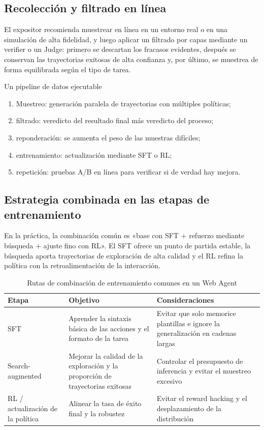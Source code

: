 \documentclass[a4paper]{article}
\begin{document}
\subsection{Recolección y filtrado en línea}
El expositor recomienda muestrear en línea en un entorno real o en una simulación de alta fidelidad, y luego aplicar un filtrado por capas mediante un verifier o un Judge: primero se descartan los fracasos evidentes, después se conservan las trayectorias exitosas de alta confianza y, por último, se muestrea de forma equilibrada según el tipo de tarea.

\begin{knowledgebox}{Un pipeline de datos ejecutable}
\begin{enumerate}
    \item Muestreo: generación paralela de trayectorias con múltiples políticas;
    \item filtrado: veredicto del resultado final más veredicto del proceso;
    \item reponderación: se aumenta el peso de las muestras difíciles;
    \item entrenamiento: actualización mediante SFT o RL;
    \item repetición: pruebas A/B en línea para verificar si de verdad hay mejora.
\end{enumerate}
\end{knowledgebox}

\subsection{Estrategia combinada en las etapas de entrenamiento}
En la práctica, la combinación común es «base con SFT + refuerzo mediante búsqueda + ajuste fino con RL». El SFT ofrece un punto de partida estable, la búsqueda aporta trayectorias de exploración de alta calidad y el RL refina la política con la retroalimentación de la interacción.

\begin{table}[H]
\centering
\small
\begin{tabular}{p{2.4cm}p{3.9cm}p{4.7cm}}
\toprule
\textbf{Etapa} & \textbf{Objetivo} & \textbf{Consideraciones} \\
\midrule
SFT & Aprender la sintaxis básica de las acciones y el formato de la tarea & Evitar que solo memorice plantillas e ignore la generalización en cadenas largas \\
Search-augmented & Mejorar la calidad de la exploración y la proporción de trayectorias exitosas & Controlar el presupuesto de inferencia y evitar el muestreo excesivo \\
RL / actualización de la política & Alinear la tasa de éxito final y la robustez & Evitar el reward hacking y el desplazamiento de la distribución \\
\bottomrule
\end{tabular}
\caption{Rutas de combinación de entrenamiento comunes en un Web Agent}
\end{table}
\end{document}
